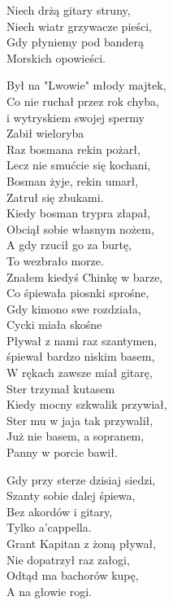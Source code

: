 \begin{multicols}{2}
Niech drżą gitary struny, \\
Niech wiatr grzywacze pieści, \\
Gdy płyniemy pod banderą\\
Morskich opowieści.\\
\newcolumn

Był na "Lwowie" młody majtek, \\
Co nie ruchał przez rok chyba, \\
i wytryskiem swojej spermy\\
Zabił wieloryba\\

Raz bosmana rekin pożarł, \\
Lecz nie smućcie się kochani, \\
Bosman żyje, rekin umarł, \\
Zatruł się zbukami.\\

Kiedy bosman trypra złapał, \\
Obciął sobie własnym nożem, \\
A gdy rzucił go za burtę, \\
To wezbrało morze.\\

Znałem kiedyś Chinkę w barze, \\
Co śpiewała piosnki sprośne, \\
Gdy kimono swe rozdziała, \\
Cycki miała skośne\\

Pływał z nami raz szantymen, \\
śpiewał bardzo niskim basem, \\
W rękach zawsze miał gitarę, \\
Ster trzymał kutasem\\

Kiedy mocny szkwalik przywiał, \\
Ster mu w jaja tak przywalił, \\
Już nie basem, a sopranem, \\
Panny w porcie bawił.\\
\newcolumn

Gdy przy sterze dzisiaj siedzi, \\
Szanty sobie dalej śpiewa, \\
Bez akordów i gitary, \\
Tylko a'cappella.\\

Grant Kapitan z żoną pływał, \\
Nie dopatrzył raz załogi, \\
Odtąd ma bachorów kupę, \\
A na głowie rogi.\\


\end{multicols}
